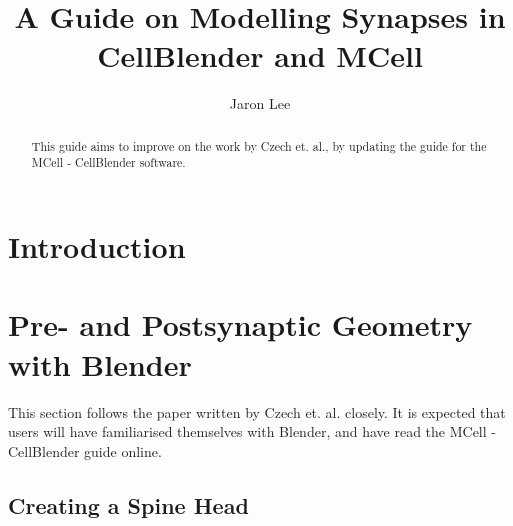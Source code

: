 \documentclass[twoside,a4paper]{refart}
\title{A Guide on Modelling Synapses in CellBlender and MCell}
\author{Jaron Lee}
\date{}
\begin{document}
\maketitle

\begin{abstract}
    This guide aims to improve on the work by Czech et. al., by updating the guide for the MCell - CellBlender software.
\end{abstract}

\newpage


\section{Introduction}


\section{Pre- and Postsynaptic Geometry with Blender}
This section follows the paper written by Czech et. al. closely. It is expected that users will have familiarised themselves with Blender, and have read the MCell - CellBlender guide online.

\subsection{Creating a Spine Head}
\end{document}

